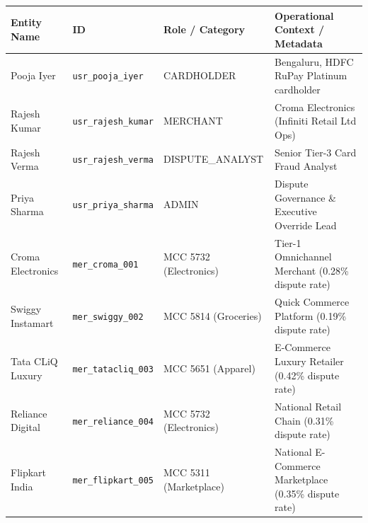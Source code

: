 \documentclass[11pt,a4paper]{article}
\begin{document}
\begin{table}[H]
\centering
\small
\renewcommand{\arraystretch}{1.2}
\begin{tabular}{p{2.8cm} p{2.2cm} p{3.2cm} p{5.5cm}}
\toprule
\textbf{Entity Name} & \textbf{ID} & \textbf{Role / Category} & \textbf{Operational Context / Metadata} \\
\midrule
Pooja Iyer & \texttt{usr\_pooja\_iyer} & CARDHOLDER & Bengaluru, HDFC RuPay Platinum cardholder \\
Rajesh Kumar & \texttt{usr\_rajesh\_kumar} & MERCHANT & Croma Electronics (Infiniti Retail Ltd Ops) \\
Rajesh Verma & \texttt{usr\_rajesh\_verma} & DISPUTE\_ANALYST & Senior Tier-3 Card Fraud Analyst \\
Priya Sharma & \texttt{usr\_priya\_sharma} & ADMIN & Dispute Governance \& Executive Override Lead \\
Croma Electronics & \texttt{mer\_croma\_001} & MCC 5732 (Electronics) & Tier-1 Omnichannel Merchant (0.28\% dispute rate) \\
Swiggy Instamart & \texttt{mer\_swiggy\_002} & MCC 5814 (Groceries) & Quick Commerce Platform (0.19\% dispute rate) \\
Tata CLiQ Luxury & \texttt{mer\_tatacliq\_003} & MCC 5651 (Apparel) & E-Commerce Luxury Retailer (0.42\% dispute rate) \\
Reliance Digital & \texttt{mer\_reliance\_004} & MCC 5732 (Electronics) & National Retail Chain (0.31\% dispute rate) \\
Flipkart India & \texttt{mer\_flipkart\_005} & MCC 5311 (Marketplace) & National E-Commerce Marketplace (0.35\% dispute rate) \\
\bottomrule
\end{tabular}
\end{table}
\end{document}
